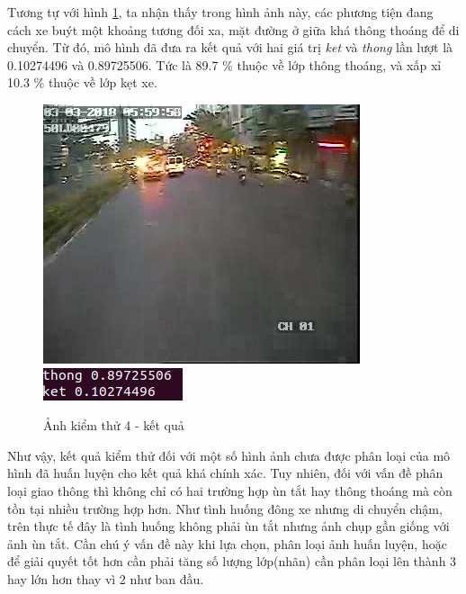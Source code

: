 	Tương tự với hình \ref{fig:test4}, ta nhận thấy trong hình ảnh này, các phương tiện đang cách xe buýt một khoảng tương đối xa, mặt đường ở giữa khá thông thoáng để di chuyển. Từ đó, mô hình đã đưa ra kết quả với hai giá trị \textit{ket} và \textit{thong} lần lượt là 0.10274496 và 0.89725506. Tức là 89.7 \% thuộc về lớp thông thoáng, và xấp xỉ 10.3 \% thuộc về lớp kẹt xe. \par
	\begin{figure}[h!]
		\centering
		\includegraphics[scale=1]{charts/image0126.jpg}
		\includegraphics[scale=0.5]{charts/last-res.png}
		\caption{Ảnh kiểm thử 4 - kết quả}
		\label{fig:test4}
	\end{figure}
	\pagebreak
	Như vậy, kết quả kiểm thử đối với một số hình ảnh chưa được phân loại của mô hình đã huấn luyện cho kết quả khá chính xác. Tuy nhiên, đối với vấn đề  phân loại giao thông thì không chỉ có hai trường hợp ùn tắt hay thông thoáng mà còn tồn tại nhiều trường hợp hơn. Như tình huống đông xe nhưng di chuyển chậm, trên thực tế đây là tình huống không phải ùn tắt nhưng ảnh chụp gần giống với ảnh ùn tắt. Cần chú ý vấn đề này khi lựa chọn, phân loại ảnh huấn luyện, hoặc để giải quyết tốt hơn cần phải tăng số lượng lớp(nhãn) cần phân loại lên thành 3 hay lớn hơn thay vì 2 như ban đầu.
	
	
	